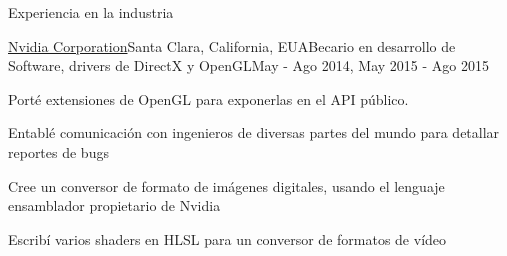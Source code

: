 \documentclass{resume} %
\begin{document}
\begin{rSection}{Experiencia en la industria}
\begin{rSubsection}{\href{http://www.nvidia.com}{Nvidia Corporation}}{Santa Clara, California, EUA}{Becario en desarrollo de Software, drivers de DirectX y OpenGL}{May - Ago 2014, May 2015 - Ago 2015}
\item Porté extensiones de OpenGL para exponerlas en el API público.
\item Entablé comunicación con ingenieros de diversas partes del mundo para detallar reportes de bugs
\item Cree un conversor de formato de imágenes digitales, usando el lenguaje ensamblador propietario de Nvidia
\item Escribí varios shaders en HLSL para un conversor de formatos de vídeo
\end{rSubsection}



\end{rSection}

\clearpage
\end{document}
